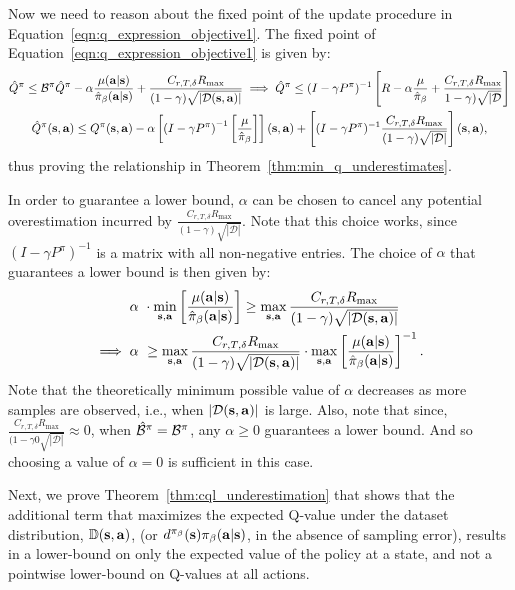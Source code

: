 Now we need to reason about the fixed point of the update procedure in Equation~\ref{eqn:q_expression_objective1}. The fixed point of Equation~\ref{eqn:q_expression_objective1} is given by:
\begin{multline*}
    \hat{Q}^\pi \leq \mathcal{B}^\pi \hat{Q}^\pi - \alpha \frac{\mu(\mathbf{a}|\mathbf{s})}{\hat{\pi}_\beta(\mathbf{a}|\mathbf{s})} + \frac{C_{r, T, \delta} R_{\max}}{(1 - \gamma) \sqrt{|\mathcal{D}(\mathbf{s}, \mathbf{a})|}} \implies \hat{Q}^\pi \leq (I - \gamma P^\pi)^{-1} \left[ R  - \alpha \frac{\mu}{\hat{\pi}_\beta} + \frac{C_{r, T, \delta} R_{\max}}{1 - \gamma) \sqrt{|\mathcal{D}}}\right]\\
    \hat{Q}^\pi(\mathbf{s}, \mathbf{a}) \leq Q^\pi(\mathbf{s}, \mathbf{a}) - \alpha \left[ \left(I - \gamma P^\pi \right)^{-1} \left[\frac{\mu}{\hat{\pi}_\beta} \right] \right](\mathbf{s}, \mathbf{a}) + \left[(I - \gamma P^\pi)^{-1} \frac{C_{r, T, \delta} R_{\max}}{(1 - \gamma) \sqrt{|\mathcal{D}|}} \right](\mathbf{s}, \mathbf{a}),
\end{multline*}
thus proving the relationship in Theorem~\ref{thm:min_q_underestimates}.

In order to guarantee a lower bound, $\alpha$ can be chosen to cancel any potential overestimation incurred by $\frac{C_{r, T, \delta} R_{\max}}{(1 - \gamma)\sqrt{|\mathcal{D}|}}$. Note that this  choice works, since $(I - \gamma P^\pi)^{-1}$ is a matrix with all non-negative entries. The choice of $\alpha$ that guarantees a lower bound is then given by:
\begin{align*}
    \alpha& ~ \cdot \min_{\mathbf{s}, \mathbf{a}} \left[\frac{\mu(\mathbf{a}|\mathbf{s})}{\hat{\pi}_\beta(\mathbf{a}|\mathbf{s})} \right] \geq \max_{\mathbf{s}, \mathbf{a}} \frac{C_{r, T, \delta} R_{\max}}{(1 - \gamma) \sqrt{|\mathcal{D}(\mathbf{s}, \mathbf{a})|}}\\
    \implies \alpha&~ \geq \max_{\mathbf{s}, \mathbf{a}} \frac{C_{r, T, \delta} R_{\max}}{(1 - \gamma) \sqrt{|\mathcal{D}(\mathbf{s}, \mathbf{a})|}} \cdot \max_{\mathbf{s}, \mathbf{a}} \left[\frac{\mu(\mathbf{a}|\mathbf{s})}{\hat{\pi}_\beta(\mathbf{a}|\mathbf{s})} \right]^{-1}.
\end{align*}
Note that the theoretically minimum possible value of $\alpha$ decreases as more samples are observed, i.e., when $|\mathcal{D}(\mathbf{s}, \mathbf{a})|$ is large. Also, note that since, $\frac{C_{r, T, \delta} R_{\max}}{(1 - \gamma0 \sqrt{|\mathcal{D}|}} \approx 0$, when $\hat{\mathcal{B}}^\pi = \mathcal{B}^\pi$, any $\alpha \geq 0$ guarantees a lower bound. And so choosing a value of $\alpha = 0$ is sufficient in this case.

Next, we prove Theorem~\ref{thm:cql_underestimation} that shows that the additional term that maximizes the expected Q-value under the dataset distribution, $\mathbb{D}(\mathbf{s}, \mathbf{a})$, (or $d^{\pi_\beta}(\mathbf{s}) {\pi_\beta}(\mathbf{a}|\mathbf{s})$, in the absence of sampling error), results in a lower-bound on only the expected value of the policy at a state, and not a pointwise lower-bound on Q-values at all actions.

